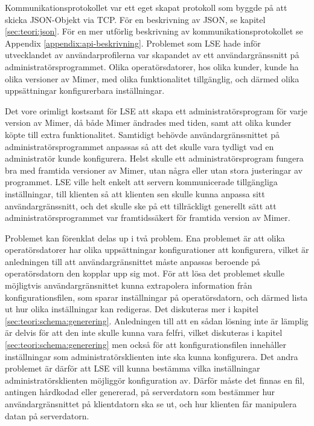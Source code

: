 Kommunikationsprotokollet var ett eget skapat protokoll som byggde på att skicka JSON-Objekt via TCP. För en beskrivning av JSON, se kapitel \ref{sec:teori:json}. För en mer utförlig beskrivning av kommunikationsprotokollet se Appendix \ref{appendix:api-beskrivning}. Problemet som LSE hade inför utvecklandet av användarprofilerna var skapandet av ett användargränssnitt på administratörsprogrammet. Olika operatörsdatorer, hos olika kunder, kunde ha olika versioner av Mimer, med olika funktionalitet tillgänglig, och därmed olika uppsättningar konfigurerbara inställningar. 

Det vore orimligt kostsamt för LSE att skapa ett administratörsprogram för varje version av Mimer, då både Mimer ändrades med tiden, samt att olika kunder köpte till extra funktionalitet. Samtidigt behövde användargränssnittet på administratörsprogrammet anpassas så att det skulle vara tydligt vad en administratör kunde konfigurera. Helst skulle ett administratörsprogram fungera bra med framtida versioner av Mimer, utan några eller utan stora justeringar av programmet. LSE ville helt enkelt att servern kommunicerade tillgängliga inställningar, till klienten så att klienten sen skulle kunna anpassa sitt användargränssnitt, och det skulle ske på ett tillräckligt generellt sätt att administratörsprogrammet var framtidssäkert för framtida version av Mimer.

Problemet kan förenklat delas up i två problem. Ena problemet är att olika operatörsdatorer har olika uppsättningar konfigurationer att konfigurera, vilket är anledningen till att användargränsnittet måste anpassas beroende på operatörsdatorn den kopplar upp sig mot. För att lösa det problemet skulle möjligtvis användargränsnittet kunna extrapolera information från konfigurationsfilen, som sparar inställningar på operatörsdatorn, och därmed lista ut hur olika inställningar kan redigeras. Det diskuteras mer i kapitel \ref{sec:teori:schema:generering}. Anledningen till att en sådan lösning inte är lämplig är delvis för att den inte skulle kunna vara felfri, vilket diskuteras i kapitel \ref{sec:teori:schema:generering} men också för att konfigurationsfilen innehåller inställningar som administratörsklienten inte ska kunna konfigurera. Det andra problemet är därför att LSE vill kunna bestämma vilka inställningar administratörsklienten möjliggör konfiguration av. Därför måste det finnas en fil, antingen hårdkodad eller genererad, på serverdatorn som bestämmer hur användargränsnittet på klientdatorn ska se ut, och hur klienten får manipulera datan på serverdatorn.

